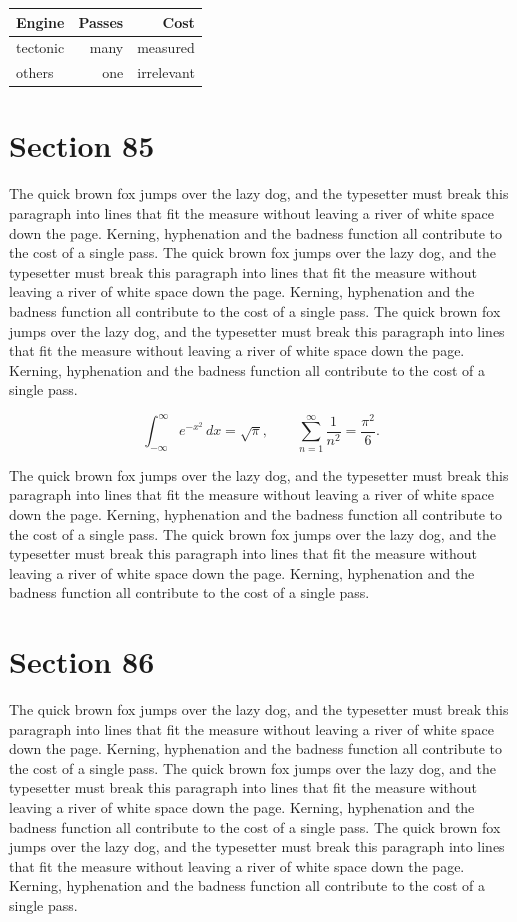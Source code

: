 \documentclass{article}
\begin{document}
\begin{center}
\begin{tabular}{lrr}
\toprule
Engine & Passes & Cost \\
\midrule
tectonic & many & measured \\
others & one & irrelevant \\
\bottomrule
\end{tabular}
\end{center}

\section{Section 85}
The quick brown fox jumps over the lazy dog, and the typesetter must break this paragraph into lines that fit the measure without leaving a river of white space down the page. Kerning, hyphenation and the badness function all contribute to the cost of a single pass. The quick brown fox jumps over the lazy dog, and the typesetter must break this paragraph into lines that fit the measure without leaving a river of white space down the page. Kerning, hyphenation and the badness function all contribute to the cost of a single pass. The quick brown fox jumps over the lazy dog, and the typesetter must break this paragraph into lines that fit the measure without leaving a river of white space down the page. Kerning, hyphenation and the badness function all contribute to the cost of a single pass. 

\begin{equation}
\int_{-\infty}^{\infty} e^{-x^{2}}\,dx = \sqrt{\pi}, \qquad
\sum_{n=1}^{\infty} \frac{1}{n^{2}} = \frac{\pi^{2}}{6}.
\end{equation}

The quick brown fox jumps over the lazy dog, and the typesetter must break this paragraph into lines that fit the measure without leaving a river of white space down the page. Kerning, hyphenation and the badness function all contribute to the cost of a single pass. The quick brown fox jumps over the lazy dog, and the typesetter must break this paragraph into lines that fit the measure without leaving a river of white space down the page. Kerning, hyphenation and the badness function all contribute to the cost of a single pass. 
\section{Section 86}
The quick brown fox jumps over the lazy dog, and the typesetter must break this paragraph into lines that fit the measure without leaving a river of white space down the page. Kerning, hyphenation and the badness function all contribute to the cost of a single pass. The quick brown fox jumps over the lazy dog, and the typesetter must break this paragraph into lines that fit the measure without leaving a river of white space down the page. Kerning, hyphenation and the badness function all contribute to the cost of a single pass. The quick brown fox jumps over the lazy dog, and the typesetter must break this paragraph into lines that fit the measure without leaving a river of white space down the page. Kerning, hyphenation and the badness function all contribute to the cost of a single pass. 
\end{document}
